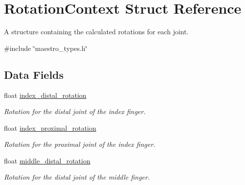 \hypertarget{struct_rotation_context}{}\section{Rotation\+Context Struct Reference}
\label{struct_rotation_context}


A structure containing the calculated rotations for each joint.  




{\ttfamily \#include \char`\"{}maestro\+\_\+types.\+h\char`\"{}}

\subsection*{Data Fields}
\begin{DoxyCompactItemize}
\item 
\mbox{\label{struct_rotation_context_ab3f85c0f3bf1d47fe36be1e48a27a6e7}} 
float \hyperlink{struct_rotation_context_ab3f85c0f3bf1d47fe36be1e48a27a6e7}{index\+\_\+distal\+\_\+rotation}
\begin{DoxyCompactList}\small\item\em Rotation for the distal joint of the index finger. \end{DoxyCompactList}\item 
\mbox{\label{struct_rotation_context_a81b612bd6d1aa2c5b06098761225f82b}} 
float \hyperlink{struct_rotation_context_a81b612bd6d1aa2c5b06098761225f82b}{index\+\_\+proximal\+\_\+rotation}
\begin{DoxyCompactList}\small\item\em Rotation for the proximal joint of the index finger. \end{DoxyCompactList}\item 
\mbox{\label{struct_rotation_context_a1a25d20b5bde0340a122324de57c792c}} 
float \hyperlink{struct_rotation_context_a1a25d20b5bde0340a122324de57c792c}{middle\+\_\+distal\+\_\+rotation}
\begin{DoxyCompactList}\small\item\em Rotation for the distal joint of the middle finger. \end{DoxyCompactList}\item 
\mbox{\label{struct_rotation_context_ad66ce02bfed77b041d5848f74589760c}} 

\end{DoxyCompactItemize}
